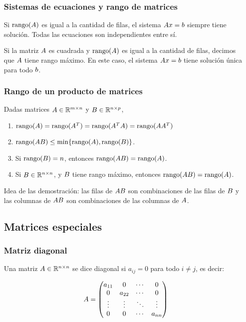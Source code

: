 \subsubsection{Sistemas de ecuaciones y rango de matrices}

Si $\rank(\Ab)$ es igual a la cantidad de filas, el sistema $\Ab \xb = \bb$ siempre tiene solución. Todas las ecuaciones son independientes entre sí.

Si la matriz $\Ab$ es cuadrada y $\rank(\Ab)$ es igual a la cantidad de filas, decimos que $\Ab$ tiene rango máximo. En este caso, el sistema $\Ab \xb = \bb$ tiene solución única para todo $\bb$.

\subsubsection{Rango de un producto de matrices}

Dadas matrices $\Ab \in \mathbb{R}^{m \times n}$ y $\Bb \in \mathbb{R}^{n \times p}$,

\begin{enumerate}
\item  $\rank(\Ab) = \rank(\Ab^T) = \rank(\Ab^T\Ab) = \rank(\Ab\Ab^T)$
\item  $\rank(\Ab \Bb) \le \min\{\rank(\Ab), \rank(\Bb)\}$.
\item  Si $\rank(\Bb) = n$, entonces $\rank(\Ab \Bb) = \rank(\Ab)$.
\item  Si $\Bb \in \R^{n \times n}$, y $\Bb$ tiene rango máximo, entonces $\rank(\Ab \Bb) = \rank(\Ab)$.
\end{enumerate}

Idea de las demostración: las filas de $\Ab \Bb$ son combinaciones de las filas de $\Bb$ y las columnas de $\Ab\Bb$ son combinaciones de las columnas de $\Ab$.


\subsection{Matrices especiales}

\subsubsection{Matriz diagonal}

Una matriz $\Ab \in \R^{n \times n}$ se dice diagonal si $a_{ij} = 0$ para todo $i \neq j$, es decir:

$$
\Ab =\begin{pmatrix}a_{11}&0&\cdots &0\\0&a_{22}&\cdots &0\\\vdots &\vdots &\ddots &\vdots \\0&0&\cdots &a_{nn}\\\end{pmatrix}
$$

